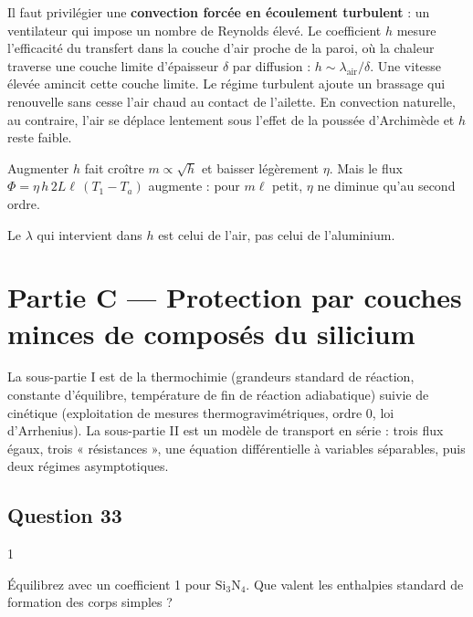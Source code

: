 \documentclass[11pt,a4paper]{article}
\begin{document}
Il faut privilégier une \textbf{convection forcée en écoulement turbulent} : un ventilateur qui impose un nombre de Reynolds élevé. Le coefficient \(h\) mesure l'efficacité du transfert dans la couche d'air proche de la paroi, où la chaleur traverse une couche limite d'épaisseur \(\delta\) par diffusion : \(h\sim\lambda_{\mathrm{air}}/\delta\). Une vitesse élevée amincit cette couche limite. Le régime turbulent ajoute un brassage qui renouvelle sans cesse l'air chaud au contact de l'ailette. En convection naturelle, au contraire, l'air se déplace lentement sous l'effet de la poussée d'Archimède et \(h\) reste faible.

Augmenter \(h\) fait croître \(m\propto\sqrt h\) et baisser légèrement \(\eta\). Mais le flux \(\Phi=\eta\,h\,2L\ell\,(T_1-T_a)\) augmente : pour \(m\ell\) petit, \(\eta\) ne diminue qu'au second ordre.

\begin{piege}

Le \(\lambda\) qui intervient dans \(h\) est celui de l'air, pas celui de l'aluminium.

\end{piege}

\hypertarget{partie-c-protection-par-couches-minces-de-composuxe9s-du-silicium}{%
\section{Partie C --- Protection par couches minces de composés du silicium}\label{partie-c-protection-par-couches-minces-de-composuxe9s-du-silicium}}

La sous-partie I est de la thermochimie (grandeurs standard de réaction, constante d'équilibre, température de fin de réaction adiabatique) suivie de cinétique (exploitation de mesures thermogravimétriques, ordre 0, loi d'Arrhenius). La sous-partie II est un modèle de transport en série : trois flux égaux, trois « résistances », une équation différentielle à variables séparables, puis deux régimes asymptotiques.

\hypertarget{question-33}{%
\subsection{Question 33}\label{question-33}}

\begin{indication}{1}

Équilibrez avec un coefficient 1 pour \(\mathrm{Si_3N_4}\). Que valent les enthalpies standard de formation des corps simples ?

\end{indication}
\end{document}

